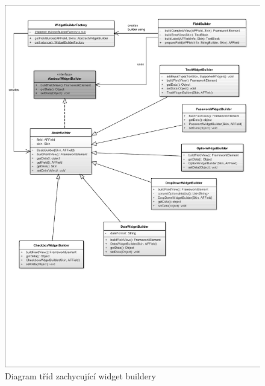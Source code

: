 \begin{figure}
\begin{center}
\includegraphics[width=\textwidth, height=\textheight, keepaspectratio, trim=4 4 4 4, clip]{figures/factoryWidgetBuilders}
\caption{Diagram tříd zachycující widget buildery}
\label{img:factoryWidgetBuilders}
\end{center}
\end{figure}

